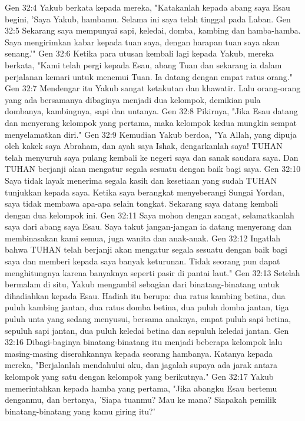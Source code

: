 Gen 32:4  Yakub berkata kepada mereka, "Katakanlah kepada abang saya Esau begini, 'Saya Yakub, hambamu. Selama ini saya telah tinggal pada Laban.
Gen 32:5  Sekarang saya mempunyai sapi, keledai, domba, kambing dan hamba-hamba. Saya mengirimkan kabar kepada tuan saya, dengan harapan tuan saya akan senang.'"
Gen 32:6  Ketika para utusan kembali lagi kepada Yakub, mereka berkata, "Kami telah pergi kepada Esau, abang Tuan dan sekarang ia dalam perjalanan kemari untuk menemui Tuan. Ia datang dengan empat ratus orang."
Gen 32:7  Mendengar itu Yakub sangat ketakutan dan khawatir. Lalu orang-orang yang ada bersamanya dibaginya menjadi dua kelompok, demikian pula dombanya, kambingnya, sapi dan untanya.
Gen 32:8  Pikirnya, "Jika Esau datang dan menyerang kelompok yang pertama, maka kelompok kedua mungkin sempat menyelamatkan diri."
Gen 32:9  Kemudian Yakub berdoa, "Ya Allah, yang dipuja oleh kakek saya Abraham, dan ayah saya Ishak, dengarkanlah saya! TUHAN telah menyuruh saya pulang kembali ke negeri saya dan sanak saudara saya. Dan TUHAN berjanji akan mengatur segala sesuatu dengan baik bagi saya.
Gen 32:10  Saya tidak layak menerima segala kasih dan kesetiaan yang sudah TUHAN tunjukkan kepada saya. Ketika saya berangkat menyeberangi Sungai Yordan, saya tidak membawa apa-apa selain tongkat. Sekarang saya datang kembali dengan dua kelompok ini.
Gen 32:11  Saya mohon dengan sangat, selamatkanlah saya dari abang saya Esau. Saya takut jangan-jangan ia datang menyerang dan membinasakan kami semua, juga wanita dan anak-anak.
Gen 32:12  Ingatlah bahwa TUHAN telah berjanji akan mengatur segala sesuatu dengan baik bagi saya dan memberi kepada saya banyak keturunan. Tidak seorang pun dapat menghitungnya karena banyaknya seperti pasir di pantai laut."
Gen 32:13  Setelah bermalam di situ, Yakub mengambil sebagian dari binatang-binatang untuk dihadiahkan kepada Esau. Hadiah itu berupa: dua ratus kambing betina, dua puluh kambing jantan, dua ratus domba betina, dua puluh domba jantan, tiga puluh unta yang sedang menyusui, bersama anaknya, empat puluh sapi betina, sepuluh sapi jantan, dua puluh keledai betina dan sepuluh keledai jantan.
Gen 32:16  Dibagi-baginya binatang-binatang itu menjadi beberapa kelompok lalu masing-masing diserahkannya kepada seorang hambanya. Katanya kepada mereka, "Berjalanlah mendahului aku, dan jagalah supaya ada jarak antara kelompok yang satu dengan kelompok yang berikutnya."
Gen 32:17  Yakub memerintahkan kepada hamba yang pertama, "Jika abangku Esau bertemu denganmu, dan bertanya, 'Siapa tuanmu? Mau ke mana? Siapakah pemilik binatang-binatang yang kamu giring itu?'
